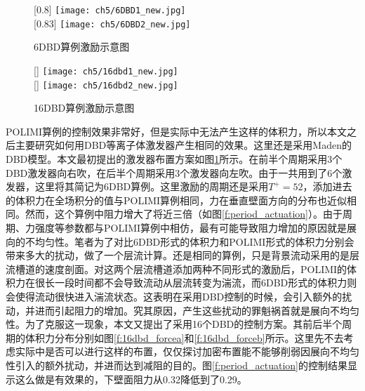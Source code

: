\begin{figure}[htb]
  \centering
  [0.8\textwidth]
  {\texttt{[image: ch5/6DBD1\_new.jpg]}}
  \\\bigskip
  [0.83\textwidth]
  {\texttt{[image: ch5/6DBD2\_new.jpg]}}
  \caption{6DBD算例激励示意图}\label{f:6dbd_force}
\end{figure}
\begin{figure}[htb]
  \centering
  [\textwidth]
  {\texttt{[image: ch5/16dbd1\_new.jpg]}}
  \\\bigskip
  [\textwidth]
  {\texttt{[image: ch5/16dbd2\_new.jpg]}}
  \caption{16DBD算例激励示意图}\label{f:16dbd_force}
\end{figure}
POLIMI算例的控制效果非常好，但是实际中无法产生这样的体积力，所以本文之后主要研究如何用DBD等离子体激发器产生相同的效果。这里还是采用Maden的\cite{Maden2013}DBD模型。本文最初提出的激发器布置方案如图\ref{f:6dbd_force}所示。在前半个周期采用3个DBD激发器向右吹，在后半个周期采用3个激发器向左吹。由于一共用到了6个激发器，这里将其简记为6DBD算例。这里激励的周期还是采用$T^+=52$，添加进去的体积力在全场积分的值与POLIMI算例相同，力在垂直壁面方向的分布也近似相同。然而，这个算例中阻力增大了将近三倍（如图\ref{f:period_actuation}）。由于周期、力强度等参数都与POLIMI算例中相仿，最有可能导致阻力增加的原因就是展向的不均匀性。笔者为了对比6DBD形式的体积力和POLIMI形式的体积力分别会带来多大的扰动，做了一个层流计算。还是相同的算例，只是背景流动采用的是层流槽道的速度剖面。对这两个层流槽道添加两种不同形式的激励后，POLIMI的体积力在很长一段时间都不会导致流动从层流转变为湍流，而6DBD形式的体积力则会使得流动很快进入湍流状态。这表明在采用DBD控制的时候，会引入额外的扰动，并进而引起阻力的增加。究其原因，产生这些扰动的罪魁祸首就是展向不均匀性。为了克服这一现象，本文又提出了采用16个DBD的控制方案。其前后半个周期的体积力分布分别如图\ref{f:16dbd_forcea}和\ref{f:16dbd_forceb}所示。这里先不去考虑实际中是否可以进行这样的布置，仅仅探讨加密布置能不能够削弱因展向不均匀性引入的额外扰动，并进而达到减阻的目的。图\ref{f:period_actuation}的控制结果显示这么做是有效果的，下壁面阻力从0.32降低到了0.29。


